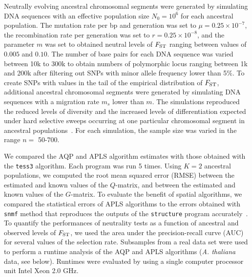 Neutrally evolving ancestral chromosomal segments were generated by simulating DNA sequences with an effective  population size $N_0 = 10^6$ for each ancestral population. The mutation rate per bp and generation was set to $\mu = 0.25 \times 10^{-7}$, the recombination rate per generation was set to $r = 0.25 \times 10^{-8}$, and the parameter $m$ was set to obtained neutral levels of $F_{\rm ST}$ ranging between values of $0.005$ and $0.10$. The number of base pairs for each DNA sequence was varied between 10k to 300k to obtain numbers of polymorphic locus ranging between 1k and 200k after filtering out SNPs with minor allele frequency lower than 5$\%$.  To create SNPs with values in the tail of the empirical distribution of $F_{\rm ST}$,  additional ancestral chromosomal segments were generated by simulating DNA sequences with a migration rate $m_s$ lower than $m$. The simulations reproduced the reduced levels of diversity and the increased levels of differentiation expected under hard selective sweeps occurring at one particular chromosomal segment in ancestral populations~\citep{Martins2016}.  For each simulation, the sample size  was varied in the range $n =$ 50-700.

 We compared the AQP and APLS algorithm estimates with those obtained with the {\tt tess3} algorithm.  Each program was run 5 times.  Using $K = 2$ ancestral populations, we computed the root mean squared error (RMSE) between the estimated and known values of the $Q$-matrix, and between  the estimated and known values of the $G$-matrix. 
To evaluate the benefit of spatial algorithms, we compared the statistical errors of APLS algorithms to the errors obtained with {\tt snmf} method that reproduces the outputs of the {\tt structure} program accurately~\citep{Frichot2014,Frichot2015}.  To quantify the performances of neutrality tests as a function of ancestral and observed levels of $F_{\rm ST}$, we used the area under the precision-recall curve (AUC) for several values of the selection rate.  Subsamples from a real data set were used to perform a runtime analysis of the AQP and APLS algorithms ({\it A. thaliana} data, see below). Runtimes were evaluated by using a single computer processor unit Intel Xeon 2.0 GHz.

